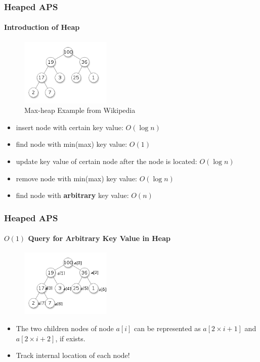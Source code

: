 \documentclass{beamer}
\begin{document}
\begin{frame}
\frametitle{Heaped APS}
\framesubtitle{Introduction of Heap}
\begin{figure}[ht]
\centering
\includegraphics[height=32mm]{heap.png}
\caption{Max-heap Example from Wikipedia}
\end{figure}
\begin{itemize}
\item insert node with certain key value: $O(\log n)$
\item find node with min(max) key value: $O(1)$
\item update key value of certain node after the node is located: $O(\log n)$
\item remove node with min(max) key value: $O(\log n)$
\item find node with {\bf arbitrary} key value: $O(n)$
\end{itemize}
\end{frame}

\begin{frame}
\frametitle{Heaped APS}
\framesubtitle{$O(1)$ Query for Arbitrary Key Value in Heap}
\begin{figure}[ht]
\centering
\includegraphics[height=32mm]{heap2.png}
\end{figure}
\begin{itemize}
\item The two children nodes of node $a[i]$ can be represented as $a[2 \times i + 1]$ and $a[2 \times i + 2]$, if exists.
\item Track internal location of each node!
\end{itemize}

\end{frame}
\end{document}
